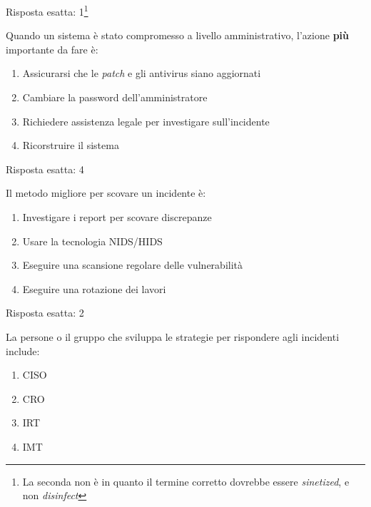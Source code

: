 \begin{Answer} [
  ref={esIRBC2},
  number={2}
  ]

  \Question Risposta esatta: 1\footnote{La seconda non \`e in quanto il termine
corretto dovrebbe essere \textit{sinetized}, e non \textit{disinfect}}
\end{Answer}


\begin{Exercise} [
  title={Quiz},
  label={esIRBC3}
  ]

  \Question Quando un sistema \`e stato compromesso a livello amministrativo,
l'azione \textbf{pi\`u} importante da fare \`e:
\begin{enumerate}
 \item Assicurarsi che le \textit{patch} e gli antivirus siano aggiornati
 \item Cambiare la password dell'amministratore
 \item Richiedere assistenza legale per investigare sull'incidente
 \item Ricorstruire il sistema
\end{enumerate}
\end{Exercise}

\begin{Answer} [
  ref={esIRBC3},
  number={3}
  ]

  \Question Risposta esatta: 4
\end{Answer}


\begin{Exercise} [
  title={Quiz},
  label={esIRBC4}
  ]

  \Question Il metodo migliore per scovare un incidente \`e:
  \begin{enumerate}
   \item Investigare i report per scovare discrepanze
   \item Usare la tecnologia NIDS/HIDS
   \item Eseguire una scansione regolare delle vulnerabilit\`a
   \item Eseguire una rotazione dei lavori
  \end{enumerate}
\end{Exercise}

\begin{Answer} [
  ref={esIRBC4},
  number={4}
  ]

  \Question Risposta esatta: 2
\end{Answer}


\begin{Exercise} [
  title={Quiz},
  label={esIRBC5}
  ]

  \Question La persone o il gruppo che sviluppa le strategie per rispondere
agli incidenti include:
\begin{enumerate}
 \item CISO
 \item CRO
 \item IRT
 \item IMT
\end{enumerate}

\end{Exercise}

